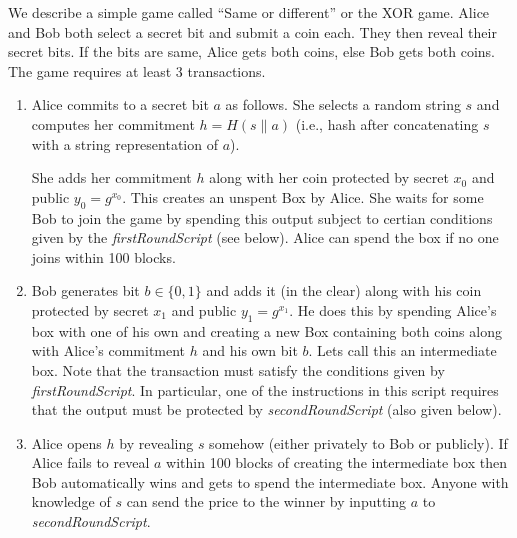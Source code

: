 \documentclass[11pt]{article}
\begin{document}
We describe a simple game called ``Same or different'' or the XOR game. Alice and Bob both select a secret bit and submit a coin each. They then reveal their secret bits. If the bits are same, Alice gets both coins, else Bob gets both coins. The game requires at least 3 transactions. 
\begin{enumerate}
	\item Alice commits to a secret bit $a$ as follows. She selects a random string $s$ and computes her commitment $h = H(s\|a)$ (i.e., hash after concatenating $s$ with a string representation of $a$).
	
	
	She adds her commitment $h$ along with her coin protected by secret $x_0$ and public $y_0 = g^{x_0}$. This creates an unspent Box by Alice. She waits for some Bob to join the game by spending this output subject to certian conditions given by the {\em firstRoundScript} (see below). Alice can spend the box if no one joins within 100 blocks. 
	\item Bob generates bit $b\in \{0,1\}$ and adds it (in the clear) along with his coin protected by secret $x_1$ and public $y_1 = g^{x_1}$. He does this by spending Alice's box with one of his own and creating a new Box containing both coins along with Alice's commitment $h$ and his own bit $b$. Lets call this an intermediate box. Note that the transaction must satisfy the conditions given by {\em firstRoundScript}. In particular, one of the instructions in this script requires that the output must be protected by {\em secondRoundScript} (also given below).
	\item Alice opens $h$ by revealing $s$ somehow (either privately to Bob or publicly). If Alice fails to reveal $a$ within 100 blocks of creating the intermediate box then Bob automatically wins and gets to spend the intermediate box. %
	Anyone with knowledge of $s$ can send the price to the winner by inputting $a$ to {\em secondRoundScript}. 
	
\end{enumerate}
\end{document}
